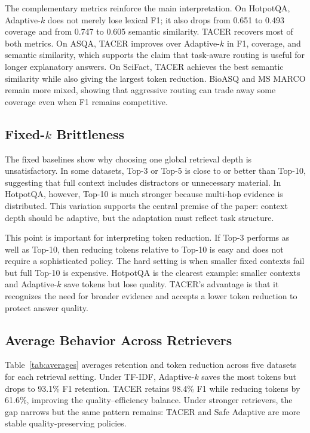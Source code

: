\documentclass[11pt]{article}
\begin{document}
The complementary metrics reinforce the main interpretation. On HotpotQA, Adaptive-$k$ does not merely lose lexical F1; it also drops from 0.651 to 0.493 coverage and from 0.747 to 0.605 semantic similarity. TACER recovers most of both metrics. On ASQA, TACER improves over Adaptive-$k$ in F1, coverage, and semantic similarity, which supports the claim that task-aware routing is useful for longer explanatory answers. On SciFact, TACER achieves the best semantic similarity while also giving the largest token reduction. BioASQ and MS MARCO remain more mixed, showing that aggressive routing can trade away some coverage even when F1 remains competitive.

\subsection{Fixed-$k$ Brittleness}

The fixed baselines show why choosing one global retrieval depth is unsatisfactory. In some datasets, Top-3 or Top-5 is close to or better than Top-10, suggesting that full context includes distractors or unnecessary material. In HotpotQA, however, Top-10 is much stronger because multi-hop evidence is distributed. This variation supports the central premise of the paper: context depth should be adaptive, but the adaptation must reflect task structure.

This point is important for interpreting token reduction. If Top-3 performs as well as Top-10, then reducing tokens relative to Top-10 is easy and does not require a sophisticated policy. The hard setting is when smaller fixed contexts fail but full Top-10 is expensive. HotpotQA is the clearest example: smaller contexts and Adaptive-$k$ save tokens but lose quality. TACER's advantage is that it recognizes the need for broader evidence and accepts a lower token reduction to protect answer quality.

\subsection{Average Behavior Across Retrievers}

Table~\ref{tab:averages} averages retention and token reduction across five datasets for each retrieval setting. Under TF-IDF, Adaptive-$k$ saves the most tokens but drops to 93.1\% F1 retention. TACER retains 98.4\% F1 while reducing tokens by 61.6\%, improving the quality--efficiency balance. Under stronger retrievers, the gap narrows but the same pattern remains: TACER and Safe Adaptive are more stable quality-preserving policies.
\end{document}
